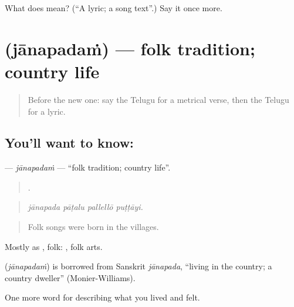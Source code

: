 \begin{tcolorbox}[breakable,colback=teal!4,colframe=teal!35!black,title={Before you move on}]
What does  mean? (\textquotedblleft{}A lyric; a song text\textquotedblright{}.) Say it once more.
\end{tcolorbox}
\section[\texorpdfstring{\te{జానపదం} (jānapadaṁ)}{జానపదం (jānapadaṁ)}]{ (jānapadaṁ) — folk tradition; country life}

\label{lesson:TE-C539-janapadam}



\begin{quote}
Before the new one: say the Telugu for a metrical verse, then the Telugu for a lyric.
\end{quote}

\subsection*{You'll want to know: }
\textbf{} — \emph{jānapadaṁ} — \textquotedblleft{}folk tradition; country life\textquotedblright{}.

\begin{quote}
   .
\end{quote}

\begin{quote}
\emph{jānapada pāṭalu pallellō puṭṭāyi.}
\end{quote}

\begin{quote}
Folk songs were born in the villages.
\end{quote}

Mostly as , folk:  , folk arts.

\begin{cousinweb}
\textbf{} (\emph{jānapadaṁ}) is borrowed from Sanskrit \emph{jānapada}, \textquotedblleft{}living in the country; a country dweller\textquotedblright{} (Monier-Williams).
\end{cousinweb}

\begin{grammarlens}[title={What you've built}]
One more word for describing what you lived and felt.
\end{grammarlens}

